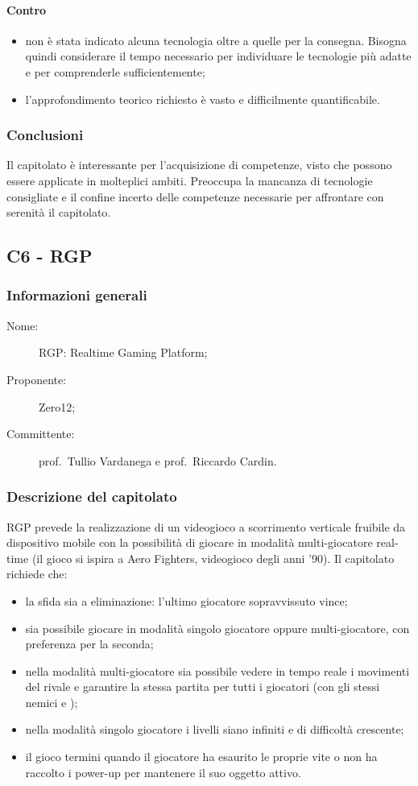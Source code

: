 \paragraph*{Contro}
\begin{itemize}
	\item non è stata indicato alcuna tecnologia oltre a quelle per la consegna. Bisogna quindi considerare il tempo necessario per individuare le tecnologie più adatte e per comprenderle sufficientemente;
	\item l'approfondimento teorico richiesto è vasto e difficilmente quantificabile.
\end{itemize}
\subsubsection{Conclusioni}
Il capitolato è interessante per l'acquisizione di competenze, visto che possono essere applicate in molteplici ambiti. Preoccupa la mancanza di tecnologie consigliate e il confine incerto delle competenze necessarie per affrontare con serenità il capitolato.

\subsection{C6 - RGP}
\subsubsection{Informazioni generali}
\begin{description}
	\item[Nome:] RGP: Realtime Gaming Platform;
	\item[Proponente:] Zero12;
	\item[Committente:] prof.~Tullio Vardanega e prof.~Riccardo Cardin.
\end{description}
\subsubsection{Descrizione del capitolato}
RGP prevede la realizzazione di un videogioco a scorrimento verticale fruibile da dispositivo mobile con la possibilità di giocare in modalità multi-giocatore real-time (il gioco si ispira a Aero Fighters, videogioco degli anni '90). Il capitolato richiede che:
\begin{itemize}
	\item la sfida sia a eliminazione: l'ultimo giocatore sopravvissuto vince;
	\item sia possibile giocare in modalità singolo giocatore oppure multi-giocatore, con preferenza per la seconda; 
	\item nella modalità multi-giocatore sia possibile vedere in tempo reale i movimenti del rivale e garantire la stessa partita per tutti i giocatori (con gli stessi nemici e );
	\item nella modalità singolo giocatore i livelli siano infiniti e di difficoltà crescente;
	\item il gioco termini quando il giocatore ha esaurito le proprie vite o non ha raccolto i power-up per mantenere il suo oggetto attivo.
\end{itemize}
